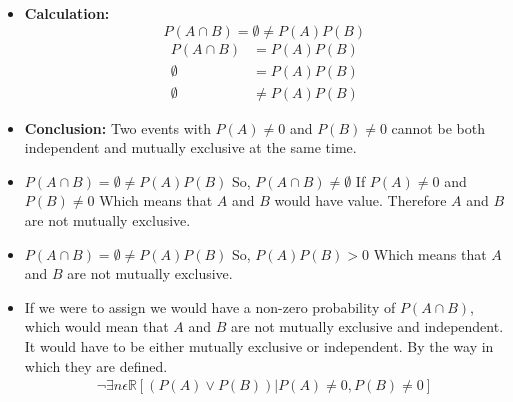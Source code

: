\documentclass{article}
\begin{document}
\begin{itemize}
\begin{itemize}
    \item[] \textbf{Calculation:}
    \[
        P(A \cap B) = \emptyset \neq P(A)P(B)
    \]
    \begin{align*}
        P(A \cap B) &= P(A)P(B)\\
            \emptyset &= P(A)P(B)\\
            \emptyset &\neq P(A)P(B)
    \end{align*}
    \item[] \textbf{Conclusion:} Two events with $P(A) \neq 0$ and $P(B) \neq 0$ cannot be 
    both independent and mutually exclusive at the same time.
    \item[] $P(A \cap B) = \emptyset \neq P(A)P(B)$ So, $P(A \cap B) \neq \emptyset$  If $P(A) \neq 0$ and $P(B) \neq 0$ Which means that $A$ and $B$ would have value.
    Therefore $A$ and $B$ are not mutually exclusive.
    \item[] $P(A \cap B) = \emptyset \neq P(A)P(B)$ So, $P(A)P(B) > 0$ Which means that $A$ and $B$ are not mutually exclusive.
    \item[] If we were to assign we would have a non-zero probability of $P(A \cap B)$, which would mean that $A$ and $B$ are not mutually exclusive and independent.
    It would have to be either mutually exclusive or independent. By the way in which they are defined. 
    \begin{align*}
        \lnot\exists n \epsilon \mathbb{R} [(P(A) \lor P(B)) | P(A) \neq 0,  P(B) \neq 0] \\
    \end{align*}    
    


\end{itemize}





\end{itemize}
\end{document}

